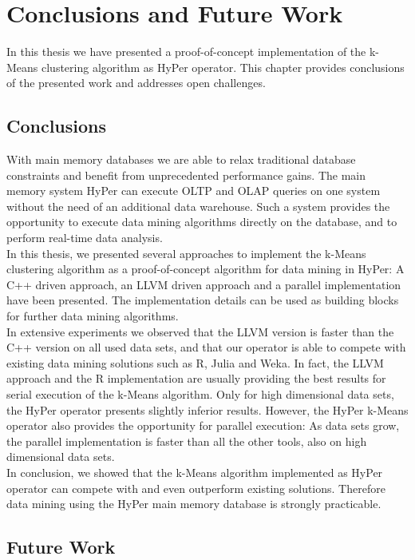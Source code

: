 \chapter{Conclusions and Future Work}\label{chapter:conclusion}
In this thesis we have presented a proof-of-concept implementation of the k-Means clustering algorithm as HyPer operator. This chapter provides conclusions of the presented work and addresses open challenges.

\section{Conclusions}
With main memory databases we are able to relax traditional database constraints and benefit from unprecedented performance gains. The main memory system HyPer can execute OLTP and OLAP queries on one system without the need of an additional data warehouse. Such a system provides the opportunity to execute data mining algorithms directly on the database, and to perform real-time data analysis. 
\\
In this thesis, we presented several approaches to implement the k-Means clustering algorithm as a proof-of-concept algorithm for data mining in HyPer: A C++ driven approach, an LLVM driven approach and a parallel implementation have been presented. The implementation details can be used as building blocks for further data mining algorithms.
\\
In extensive experiments we observed that the LLVM version is faster than the C++ version on all used data sets, and that our operator is able to compete with existing data mining solutions such as R, Julia and Weka. In fact, the LLVM approach and the R implementation are usually providing the best results for serial execution of the k-Means algorithm. Only for high dimensional data sets, the HyPer operator presents slightly inferior results. However, the HyPer k-Means operator also provides the opportunity for parallel execution: As data sets grow, the parallel implementation is faster than all the other tools, also on high dimensional data sets.
\\
In conclusion, we showed that the k-Means algorithm implemented as HyPer operator can compete with and even outperform existing solutions. Therefore data mining using the HyPer main memory database is strongly practicable.

\section{Future Work}

